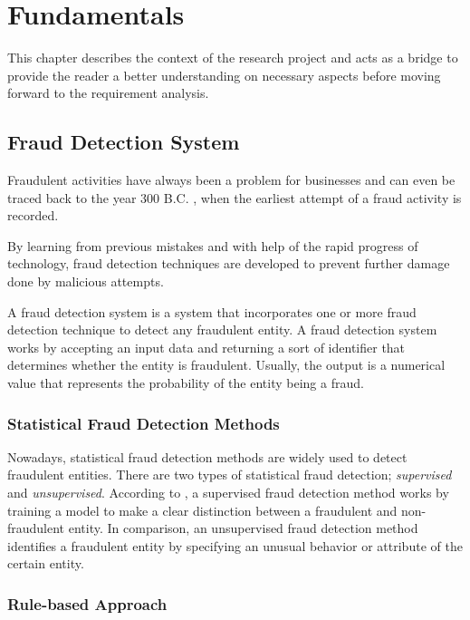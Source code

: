 \chapter{Fundamentals}

  This chapter describes the context of the research project and acts as a bridge to provide the reader a better understanding on necessary aspects before moving forward to the requirement analysis. 

  \section{Fraud Detection System}

    Fraudulent activities have always been a problem for businesses and can even be traced back to the year 300 B.C. \autocite{harrison-1998}, when the earliest attempt of a fraud activity is recorded. 

    By learning from previous mistakes and with help of the rapid progress of technology, fraud detection techniques are developed to prevent further damage done by malicious attempts. 
    
    A fraud detection system is a system that incorporates one or more fraud detection technique to detect any fraudulent entity. A fraud detection system works by accepting an input data and returning a sort of identifier that determines whether the entity is fraudulent. Usually, the output is a numerical value that represents the probability of the entity being a fraud. 

    \subsection{Statistical Fraud Detection Methods}
    
      Nowadays, statistical fraud detection methods are widely used to detect fraudulent entities. There are two types of statistical fraud detection; \emph{supervised} and \emph{unsupervised}. According to \autocite{statistical-fds}, a supervised fraud detection method works by training a model to make a clear distinction between a fraudulent and non-fraudulent entity. In comparison, an unsupervised fraud detection method identifies a fraudulent entity by specifying an unusual behavior or attribute of the certain entity.

    \subsection{Rule-based Approach}

